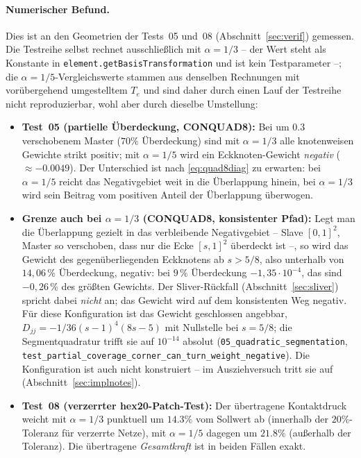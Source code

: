 \documentclass[a4paper,11pt]{article}
\def\bm#1{#1}%
\def\tfrac#1#2{#1/#2}%
\def\tilde#1{#1}%
\newcommand{\code}[1]{\texttt{\small #1}}
\newcommand{\file}[1]{\texttt{\small #1}}
\begin{document}
\paragraph{Numerischer Befund.}
Dies ist an den Geometrien der Tests~05 und~08 (Abschnitt~\ref{sec:verif}) gemessen. Die
Testreihe selbst rechnet ausschließlich mit $\alpha=\tfrac13$ -- der Wert steht als Konstante in
\code{element.getBasisTransformation} und ist kein Testparameter --; die
$\alpha=\tfrac15$-Vergleichswerte stammen aus denselben Rechnungen mit vorübergehend
umgestelltem $\bm T_e$ und sind daher durch einen Lauf der Testreihe nicht reproduzierbar,
wohl aber durch dieselbe Umstellung:
\begin{itemize}\itemsep2pt
  \item \textbf{Test~05 (partielle Überdeckung, CONQUAD8):} Bei um $0.3$ verschobenem Master
        ($70\%$ Überdeckung) sind mit $\alpha=\tfrac13$ alle knotenweisen Gewichte strikt positiv;
        mit $\alpha=\tfrac15$ wird ein Eckknoten-Gewicht \emph{negativ} ($\approx-0.0049$). Der
        Unterschied ist nach \eqref{eq:quad8diag} zu erwarten: bei $\alpha=\tfrac15$ reicht das
        Negativgebiet weit in die Überlappung hinein, bei $\alpha=\tfrac13$ wird sein Beitrag vom
        positiven Anteil der Überlappung überwogen.
  \item \textbf{Grenze auch bei $\alpha=\tfrac13$ (CONQUAD8, konsistenter Pfad):} Legt man die
        Überlappung gezielt in das verbleibende Negativgebiet -- Slave $[0,1]^2$, Master so
        verschoben, dass nur die Ecke $[s,1]^2$ überdeckt ist --, so wird das Gewicht des
        gegenüberliegenden Eckknotens ab $s>\tfrac58$, also unterhalb von $14{,}06\,\%$
        Überdeckung, negativ: bei $9\,\%$ Überdeckung $-1{,}35\cdot10^{-4}$, das sind
        $-0{,}26\,\%$ des größten Gewichts. Der Sliver-Rückfall (Abschnitt~\ref{sec:sliver})
        spricht dabei \emph{nicht} an; das Gewicht wird auf dem konsistenten Weg negativ. Für
        diese Konfiguration ist das Gewicht geschlossen angebbar,
        $\tilde D_{jj}=-\tfrac{1}{36}(s-1)^4(8s-5)$ mit Nullstelle bei $s=\tfrac58$; die
        Segmentquadratur trifft sie auf $10^{-14}$ absolut
        (\file{05\_quadratic\_segmentation}, \code{test\_partial\_coverage\_corner\_can\_turn\_weight\_negative}).
        Die Konfiguration ist auch nicht konstruiert -- im Ausziehversuch tritt sie auf
        (Abschnitt~\ref{sec:implnotes}).
  \item \textbf{Test~08 (verzerrter hex20-Patch-Test):} Der übertragene Kontaktdruck weicht mit
        $\alpha=\tfrac13$ punktuell um $14.3\%$ vom Sollwert ab (innerhalb der $20\%$-Toleranz für
        verzerrte Netze), mit $\alpha=\tfrac15$ dagegen um $21.8\%$ (außerhalb der Toleranz). Die
        übertragene \emph{Gesamtkraft} ist in beiden Fällen exakt.
\end{itemize}
\end{document}
